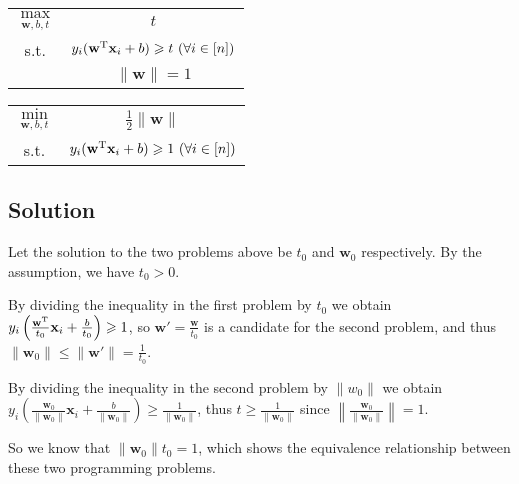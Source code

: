 \documentclass[8pt]{article}
\theoremstyle{compact}
\def\le{\leqslant}
\def\ge{\geqslant}
\begin{document}
\begin{center}
\begin{tabular}{cc}
	$\max\limits_{\mathbf w, b, t}$ & $t$\\
	s.t. & $y_i(\mathbf w^{\text T}\mathbf x_i + b) \ge t \ (\forall i \in [n])$\\
	& $\|\mathbf w\| = 1$
\end{tabular} \qquad
\begin{tabular}{cc}
	$\min\limits_{\mathbf w, b, t}$ & $\frac12 \|\mathbf w\|$\\
	s.t. & $y_i(\mathbf w^{\text T}\mathbf x_i + b) \ge 1 \ (\forall i \in [n])$
\end{tabular}
\end{center}

\subsection*{Solution}

Let the solution to the two problems above be $t_0$ and $\mathbf w_0$ respectively. By the assumption, we have $t_0 > 0$.

By dividing the inequality in the first problem by $t_0$ we obtain $y_i\left(\frac{\mathbf w^{\text T}}{t_0}\mathbf x_i + \frac{b}{t_0}\right) \ge 1$, so $\mathbf w' = \frac{\mathbf w}{t_0}$ is a candidate for the second problem, and thus $\|\mathbf w_0\| \le \|\mathbf w'\| = \frac{1}{t_0}$.

By dividing the inequality in the second problem by $\|w_0\|$ we obtain $y_i \left(\frac{\mathbf w_0}{\|\mathbf w_0\|}\mathbf x_i + \frac{b}{\|\mathbf w_0\|}\right) \ge \frac{1}{\|\mathbf w_0\|}$, thus $t \ge \frac{1}{\|\mathbf w_0\|}$ since $\left\|\frac{\mathbf w_0}{\|\mathbf w_0\|}\right\| = 1$.

So we know that $\|\mathbf w_0\|t_0 = 1$, which shows the equivalence relationship between these two programming problems.
\end{document}
